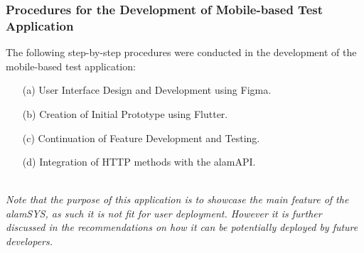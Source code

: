 \subsubsection{Procedures for the Development of Mobile-based Test Application}
\label{subsubsec:proc_mobdev}
The following step-by-step procedures were conducted in the development
of the mobile-based test application:
\begin{itemize}
    \item[(a)] User Interface Design and Development using Figma.
    \item[(b)] Creation of Initial Prototype using Flutter.
    \item[(c)] Continuation of Feature Development and Testing.
    \item[(d)] Integration of HTTP methods with the alamAPI.
\end{itemize}
\hfill \\
\textit{Note that the purpose of this application is to showcase the main feature of
the alamSYS, as such it is not fit for user deployment. However it is further discussed
in the recommendations on how it can be potentially deployed by future developers.}

